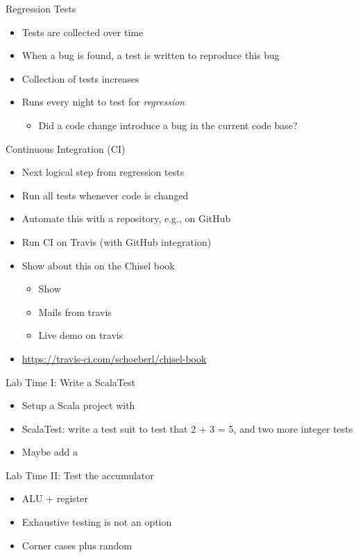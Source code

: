 \begin{frame}[fragile]{Regression Tests}
\begin{itemize}
\item Tests are collected over time
\item When a bug is found, a test is written to reproduce this bug
\item Collection of tests increases
\item Runs every night to test for \emph{regression}
\begin{itemize}
\item Did a code change introduce a bug in the current code base?
\end{itemize}
\end{itemize}
\end{frame}


\begin{frame}[fragile]{Continuous Integration (CI)}
\begin{itemize}
\item Next logical step from regression tests
\item Run all tests whenever code is changed
\item Automate this with a repository, e.g., on GitHub
\item Run CI on Travis (with GitHub integration)
\item Show about this on the Chisel book
\begin{itemize}
\item Show 
\item Mails from travis
\item Live demo on travis
\end{itemize}
\item \url{https://travis-ci.com/schoeberl/chisel-book}
\end{itemize}
\end{frame}

\begin{frame}[fragile]{Lab Time I: Write a ScalaTest}
\begin{itemize}
\item Setup a Scala project with 
\item ScalaTest: write a test suit to test  that 2 + 3 = 5, and two more integer tests
\item Maybe add a 
\end{itemize}
\end{frame}

\begin{frame}[fragile]{Lab Time II: Test the accumulator}
\begin{itemize}
\item ALU + register
\item Exhaustive testing is not an option
\item Corner cases plus random
\end{itemize}
\end{frame}

